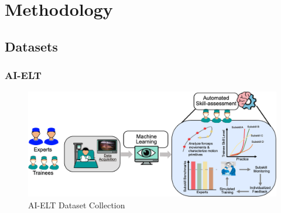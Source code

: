 \section{Methodology}

\subsection{Datasets}

\subsubsection{AI-ELT}

\begin{figure}[tbp]
    \centering
    \vspace*{-2.5mm}
    \includegraphics[width=1\linewidth]{dataset_collection.png}
    \vspace*{-6.5mm}
    \caption{AI-ELT Dataset Collection}
    \vspace*{-5mm}
    \label{fig:dataset-collection}
\end{figure}


